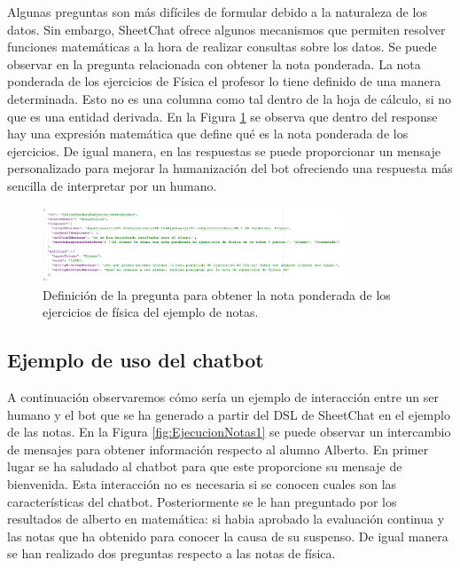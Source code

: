Algunas preguntas son más difíciles de formular debido a la naturaleza de los datos. Sin embargo, SheetChat ofrece algunos mecanismos que permiten resolver funciones matemáticas a la hora de realizar consultas sobre los datos. Se puede observar en la pregunta relacionada con obtener la nota ponderada. La nota ponderada de los ejercicios de Física el profesor lo tiene definido de una manera determinada. Esto no es una columna como tal dentro de la hoja de cálculo, si no que es una entidad derivada. En la Figura \ref{fig:DSLNotasPonderada} se observa que dentro del response hay una expresión matemática que define qué es la nota ponderada de los ejercicios. De igual manera, en las respuestas se puede proporcionar un mensaje personalizado para mejorar la humanización del bot ofreciendo una respuesta más sencilla de interpretar por un humano.

\begin{figure}[htb]
	\centering
	\includegraphics[width=0.8\textwidth]{./figs/DSLNotasPonderada.png}
	\caption{Definición de la pregunta para obtener la nota ponderada de los ejercicios de física del ejemplo de notas.}
	\label{fig:DSLNotasPonderada}
\end{figure}

\subsection{Ejemplo de uso del chatbot}

A continuación observaremos cómo sería un ejemplo de interacción entre un ser humano y el bot que se ha generado a partir del DSL de SheetChat en el ejemplo de las notas. En la Figura \ref{fig:EjecucionNotas1} se puede observar un intercambio de mensajes para obtener información respecto al alumno Alberto. En primer lugar se ha saludado al chatbot para que este proporcione su mensaje de bienvenida. Esta interacción no es necesaria si se conocen cuales son las características del chatbot. Posteriormente se le han preguntado por los resultados de alberto en matemática: si habia aprobado la evaluación continua y las notas que ha obtenido para conocer la causa de su suspenso. De igual manera se han realizado dos preguntas respecto a las notas de física.

